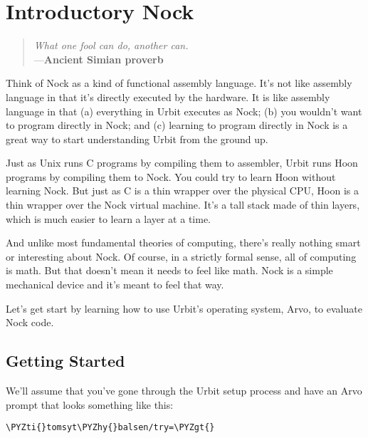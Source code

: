 \chapter{Introductory Nock}

\begin{quote}
\noindent \emph{What one fool can do, another can.}
\medskip \\
\noindent ---\textbf{Ancient Simian proverb}
\end{quote}

Think of Nock as a kind of functional assembly language.  It's not like
assembly language in that it's directly executed by the hardware.  It is like
assembly language in that (a) everything in Urbit executes as Nock; (b) you
wouldn't want to program directly in Nock; and (c) learning to program directly
in Nock is a great way to start understanding Urbit from the ground up.

Just as Unix runs C programs by compiling them to assembler, Urbit runs Hoon
programs by compiling them to Nock.  You could try to learn Hoon without
learning Nock.  But just as C is a thin wrapper over the physical CPU, Hoon is
a thin wrapper over the Nock virtual machine.  It's a tall stack made of thin
layers, which is much easier to learn a layer at a time.

And unlike most fundamental theories of computing, there's really nothing smart
or interesting about Nock.  Of course, in a strictly formal sense, all of
computing is math.  But that doesn't mean it needs to feel like math.  Nock is
a simple mechanical device and it's meant to feel that way.

Let's get start by learning how to use Urbit's operating system, Arvo, to
evaluate Nock code.

\section{Getting Started}

\label{sec:getting_started}

We'll assume that you've gone through the Urbit setup process and have an Arvo
prompt that looks something like this:

\begin{framed_shaded}
\begin{Verbatim}[fontsize=\relsize{-2.5},commandchars=\\\{\}]
\PYZti{}tomsyt\PYZhy{}balsen/try=\PYZgt{}
\end{Verbatim}
\end{framed_shaded}

